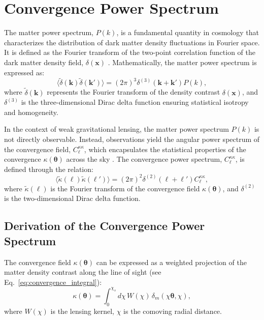 \section{Convergence Power Spectrum}
The matter power spectrum, \( P(k) \), is a fundamental quantity in cosmology that characterizes the distribution of dark matter density fluctuations in Fourier space. It is defined as the Fourier transform of the two-point correlation function of the dark matter density field, \( \delta(\mathbf{x}) \) \citep{2001PhR...340..291B}. Mathematically, the matter power spectrum is expressed as:
\begin{equation}
    \langle \tilde{\delta}(\mathbf{k}) \tilde{\delta}(\mathbf{k}') \rangle = (2\pi)^3 \delta^{(3)}(\mathbf{k} + \mathbf{k}') P(k),
    \label{eq:matter_power_spectrum}
\end{equation}
where \( \tilde{\delta}(\mathbf{k}) \) represents the Fourier transform of the density contrast \( \delta(\mathbf{x}) \), and \( \delta^{(3)} \) is the three-dimensional Dirac delta function ensuring statistical isotropy and homogeneity.

In the context of weak gravitational lensing, the matter power spectrum \( P(k) \) is not directly observable. Instead, observations yield the angular power spectrum of the convergence field, \( C_{\ell}^{\kappa\kappa} \), which encapsulates the statistical properties of the convergence \( \kappa(\boldsymbol{\theta}) \) across the sky \citep{2001PhR...340..291B}. The convergence power spectrum, \( C_{\ell}^{\kappa\kappa} \), is defined through the relation:
\begin{equation}
    \langle \tilde{\kappa}(\boldsymbol{\ell}) \tilde{\kappa}(\boldsymbol{\ell}') \rangle = (2\pi)^2 \delta^{(2)}(\boldsymbol{\ell} + \boldsymbol{\ell}') C^{\kappa\kappa}_\ell,
    \label{eq:convergence_power_spectrum}
\end{equation}
where \( \tilde{\kappa}(\boldsymbol{\ell}) \) is the Fourier transform of the convergence field \( \kappa(\boldsymbol{\theta}) \), and \( \delta^{(2)} \) is the two-dimensional Dirac delta function.

\subsection{Derivation of the Convergence Power Spectrum}
The convergence field \( \kappa(\boldsymbol{\theta}) \) can be expressed as a weighted projection of the matter density contrast along the line of sight (see Eq.~\eqref{eq:convergence_integral}):
\begin{equation}
    \kappa(\boldsymbol{\theta}) = \int_0^{\chi_s} d\chi \, W(\chi) \, \delta_m\left(\chi \boldsymbol{\theta}, \chi\right),
    \label{eq:kappa_projection}
\end{equation}
where \( W(\chi) \) is the lensing kernel, \( \chi \) is the comoving radial distance.

